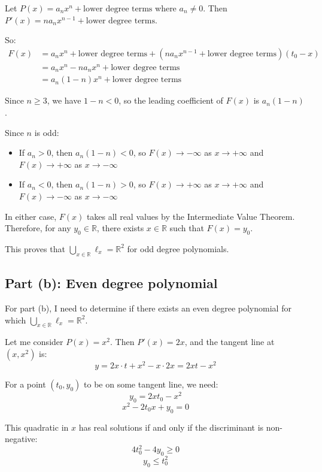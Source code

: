 \documentclass[12pt,a4paper]{article}
\theoremstyle{definition}
\begin{document}
    Let $P(x) = a_nx^n + \text{lower degree terms}$ where $a_n \neq 0$.
    Then $P'(x) = na_nx^{n-1} + \text{lower degree terms}$.

    So:
    \begin{align}
        F(x) &= a_nx^n + \text{lower degree terms} + (na_nx^{n-1} + \text{lower degree terms})(t_0 - x)\\
        &= a_nx^n - na_nx^n + \text{lower degree terms}\\
        &= a_n(1-n)x^n + \text{lower degree terms}
    \end{align}

    Since $n \geq 3$, we have $1-n < 0$, so the leading coefficient of $F(x)$ is $a_n(1-n)$.

    Since $n$ is odd:
    \begin{itemize}
        \item If $a_n > 0$, then $a_n(1-n) < 0$, so $F(x) \to -\infty$ as $x \to +\infty$ and $F(x) \to +\infty$ as $x \to -\infty$
        \item If $a_n < 0$, then $a_n(1-n) > 0$, so $F(x) \to +\infty$ as $x \to +\infty$ and $F(x) \to -\infty$ as $x \to -\infty$
    \end{itemize}

    In either case, $F(x)$ takes all real values by the Intermediate Value Theorem. Therefore, for any $y_0 \in \mathbb{R}$, there exists $x \in \mathbb{R}$ such that $F(x) = y_0$.

    This proves that $\bigcup_{x \in \mathbb{R}} \ell_x = \mathbb{R}^2$ for odd degree polynomials.

    \subsection*{Part (b): Even degree polynomial}

    For part (b), I need to determine if there exists an even degree polynomial for which $\bigcup_{x \in \mathbb{R}} \ell_x = \mathbb{R}^2$.

    Let me consider $P(x) = x^2$. Then $P'(x) = 2x$, and the tangent line at $(x, x^2)$ is:
    $$y = 2x \cdot t + x^2 - x \cdot 2x = 2xt - x^2$$

    For a point $(t_0, y_0)$ to be on some tangent line, we need:
    $$y_0 = 2xt_0 - x^2$$
    $$x^2 - 2t_0x + y_0 = 0$$

    This quadratic in $x$ has real solutions if and only if the discriminant is non-negative:
    $$4t_0^2 - 4y_0 \geq 0$$
    $$y_0 \leq t_0^2$$
\end{document}

